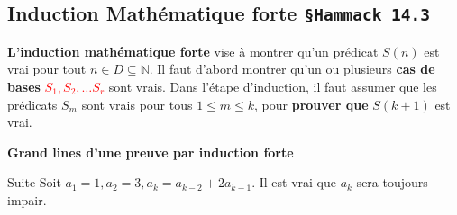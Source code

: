 \documentclass[16pt]{report}
\begin{document}
\begin{multicols*}{2}
            \section{Induction Mathématique forte \texttt{\small{\S Hammack 14.3}}}
    \textbf{L'induction mathématique forte} vise à montrer qu'un prédicat $S(n)$ est vrai pour tout 
    $n \in D \subseteq \mathbb{N}$. Il faut d'abord montrer qu'un ou plusieurs \textbf{cas de bases} 
    \textcolor{red}{$S_1, S_2, \dots S_r$} sont vrais. Dans l'étape d'induction, il faut assumer que les prédicats 
    $S_m$ sont vrais pour tous $1 \leq m \leq k$, pour \textbf{prouver que} $S(k+1)$ est vrai.   

            \begin{center}
                \textbf{Grand lines d'une preuve par induction forte} 
            \noindent{}
            \end{center}


            \begin{Theorem}{Suite}{}
                Soit $a_1 = 1, a_2 = 3, a_k = a_{k-2} + 2a_{k-1}$. Il est vrai que $a_k$ sera toujours 
                impair.
            \end{Theorem}


\end{multicols*}
\end{document}
